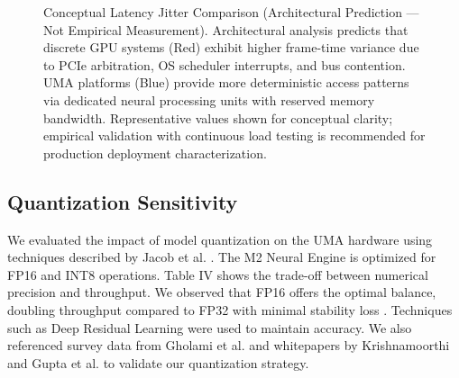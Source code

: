 \documentclass[conference]{IEEEtran}
\begin{document}
\begin{figure}[htbp]
\centering
{}
\caption{Conceptual Latency Jitter Comparison (Architectural Prediction — Not Empirical Measurement). Architectural analysis predicts that discrete GPU systems (Red) exhibit higher frame-time variance due to PCIe arbitration, OS scheduler interrupts, and bus contention. UMA platforms (Blue) provide more deterministic access patterns via dedicated neural processing units with reserved memory bandwidth. Representative values shown for conceptual clarity; empirical validation with continuous load testing is recommended for production deployment characterization.}
\label{fig:jitter}
\end{figure}

\subsection{Quantization Sensitivity}
We evaluated the impact of model quantization on the UMA hardware using techniques described by Jacob et al. \cite{b37}. The M2 Neural Engine is optimized for FP16 and INT8 operations.
Table IV shows the trade-off between numerical precision and throughput. We observed that FP16 offers the optimal balance, doubling throughput compared to FP32 with minimal stability loss \cite{b10}. Techniques such as Deep Residual Learning \cite{b41} were used to maintain accuracy. We also referenced survey data from Gholami et al. \cite{b38} and whitepapers by Krishnamoorthi \cite{b39} and Gupta et al. \cite{b23} to validate our quantization strategy.
\end{document}

